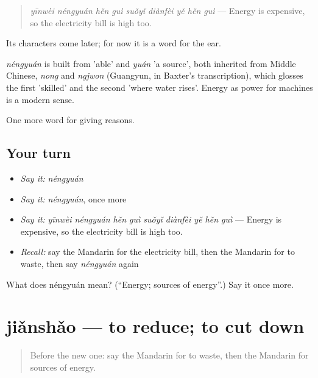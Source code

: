 \begin{quote}
\emph{yīnwèi néngyuán hěn guì suǒyǐ diànfèi yě hěn guì} — Energy is expensive, so the electricity bill is high too.
\end{quote}

Its characters come later; for now it is a word for the ear.

\begin{cousinweb}
\emph{néngyuán} is built from  'able' and \emph{yuán} 'a source', both inherited from Middle Chinese, \emph{nong} and \emph{ngjwon} (Guangyun, in Baxter's transcription), which glosses the first 'skilled' and the second 'where water rises'. Energy as power for machines is a modern sense.
\end{cousinweb}

\begin{grammarlens}[title={What you've built}]
One more word for giving reasons.
\end{grammarlens}

\subsection*{Your turn}
\begin{itemize}
\raggedright
  \item \emph{Say it:} \emph{néngyuán}
  \item \emph{Say it:} \emph{néngyuán}, once more
  \item \emph{Say it:} \emph{yīnwèi néngyuán hěn guì suǒyǐ diànfèi yě hěn guì} — Energy is expensive, so the electricity bill is high too.
  \item \emph{Recall:} say the Mandarin for the electricity bill, then the Mandarin for to waste, then say \emph{néngyuán} again
\end{itemize}

\begin{tcolorbox}[breakable,colback=teal!4,colframe=teal!35!black,title={Before you move on}]
What does néngyuán mean? (\textquotedblleft{}Energy; sources of energy\textquotedblright{}.) Say it once more.
\end{tcolorbox}
\section[jiǎnshǎo]{jiǎnshǎo — to reduce; to cut down}

\label{lesson:ZH-C383-jianshao}



\begin{quote}
Before the new one: say the Mandarin for to waste, then the Mandarin for sources of energy.
\end{quote}

